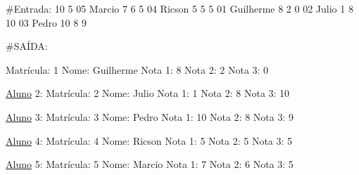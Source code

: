 \#\+Entrada\+: 10 5 05 Marcio 7 6 5 04 Ricson 5 5 5 01 Guilherme 8 2 0 02 Julio 1 8 10 03 Pedro 10 8 9

\#\+SAÍ\+DA\+:

Matrícula\+: 1 Nome\+: Guilherme Nota 1\+: 8 Nota 2\+: 2 Nota 3\+: 0

\mbox{\hyperlink{class_aluno}{Aluno}} 2\+: Matrícula\+: 2 Nome\+: Julio Nota 1\+: 1 Nota 2\+: 8 Nota 3\+: 10

\mbox{\hyperlink{class_aluno}{Aluno}} 3\+: Matrícula\+: 3 Nome\+: Pedro Nota 1\+: 10 Nota 2\+: 8 Nota 3\+: 9

\mbox{\hyperlink{class_aluno}{Aluno}} 4\+: Matrícula\+: 4 Nome\+: Ricson Nota 1\+: 5 Nota 2\+: 5 Nota 3\+: 5

\mbox{\hyperlink{class_aluno}{Aluno}} 5\+: Matrícula\+: 5 Nome\+: Marcio Nota 1\+: 7 Nota 2\+: 6 Nota 3\+: 5 